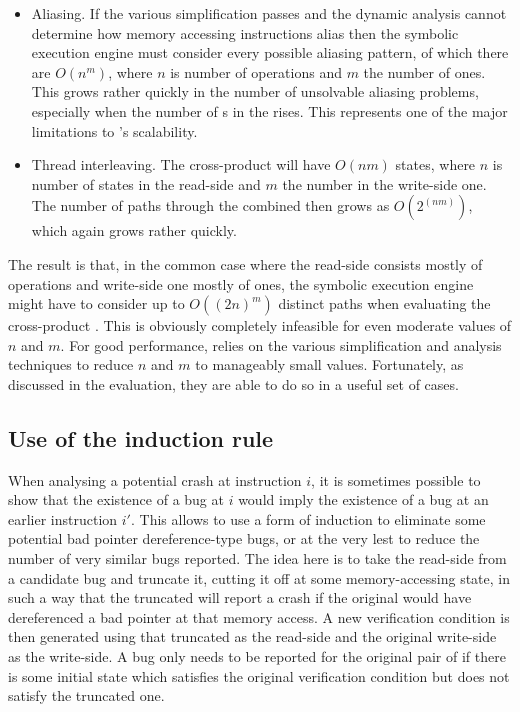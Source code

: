 \begin{itemize}
\item
  Aliasing.  If the various simplification passes and the dynamic
  analysis cannot determine how memory accessing instructions alias
  then the symbolic execution engine must consider every possible
  aliasing pattern, of which there are $O(n^m)$, where $n$ is number
  of  operations and $m$ the number of  ones.
  This grows rather quickly in the number of unsolvable aliasing
  problems, especially when the number of s in the
  {\StateMachine} rises.  This represents one of the major limitations
  to \technique's scalability.
\item
  Thread interleaving.  The cross-product {\StateMachine} will have
  $O(nm)$ states, where $n$ is number of states in the read-side
  {\StateMachine} and $m$ the number in the write-side one.  The
  number of paths through the combined {\StateMachine} then grows as
  $O(2^{(nm)})$, which again grows rather quickly.
\end{itemize}

The result is that, in the common case where the read-side
{\StateMachine} consists mostly of  operations and
write-side one mostly of  ones, the symbolic execution
engine might have to consider up to $O((2n)^m)$ distinct paths when
evaluating the cross-product {\StateMachine}.  This is obviously
completely infeasible for even moderate values of $n$ and $m$.  For
good performance, {\technique} relies on the various simplification
and analysis techniques to reduce $n$ and $m$ to manageably small
values.  Fortunately, as discussed in the evaluation, they are able to
do so in a useful set of cases.

\subsection{Use of the induction rule}

When analysing a potential crash at instruction $i$, it is sometimes
possible to show that the existence of a bug at $i$ would imply the
existence of a bug at an earlier instruction $i'$.  This allows
{\technique} to use a form of induction to eliminate some potential
bad pointer dereference-type bugs, or at the very lest to reduce the
number of very similar bugs reported.  The idea here is to take the
read-side {\StateMachine} from a candidate bug and truncate it,
cutting it off at some memory-accessing state, in such a way that the
truncated {\StateMachine} will report a crash if the original
{\StateMachine} would have dereferenced a bad pointer at that memory
access.  A new verification condition is then generated using that
truncated {\StateMachine} as the read-side {\StateMachine} and the
original write-side {\StateMachine} as the write-side.  A bug only
needs to be reported for the original pair of {\StateMachines} if
there is some initial state which satisfies the original verification
condition but does not satisfy the truncated one.

